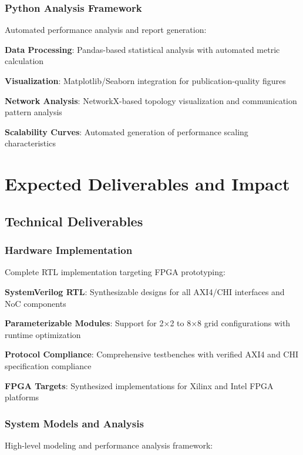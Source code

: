 \documentclass[11pt,a4paper]{article}
\begin{document}
\subsubsection{Python Analysis Framework}
Automated performance analysis and report generation:

\begin{techlist}
    \item \textbf{Data Processing}: Pandas-based statistical analysis with automated metric calculation
    \item \textbf{Visualization}: Matplotlib/Seaborn integration for publication-quality figures
    \item \textbf{Network Analysis}: NetworkX-based topology visualization and communication pattern analysis
    \item \textbf{Scalability Curves}: Automated generation of performance scaling characteristics
\end{techlist}

\section{Expected Deliverables and Impact}

\subsection{Technical Deliverables}

\subsubsection{Hardware Implementation}
Complete RTL implementation targeting FPGA prototyping:

\begin{techlist}
    \item \textbf{SystemVerilog RTL}: Synthesizable designs for all AXI4/CHI interfaces and NoC components
    \item \textbf{Parameterizable Modules}: Support for 2×2 to 8×8 grid configurations with runtime optimization
    \item \textbf{Protocol Compliance}: Comprehensive testbenches with verified AXI4 and CHI specification compliance
    \item \textbf{FPGA Targets}: Synthesized implementations for Xilinx and Intel FPGA platforms
\end{techlist}

\subsubsection{System Models and Analysis}
High-level modeling and performance analysis framework:
\end{document}
